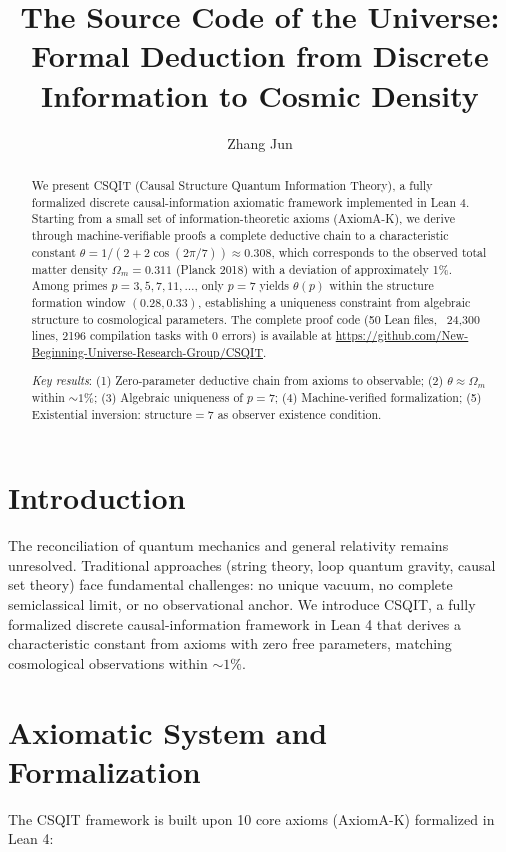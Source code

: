 \documentclass[aps,prl,twocolumn,nofootinbib,floatfix]{revtex4-2}
\title{The Source Code of the Universe: Formal Deduction from Discrete Information to Cosmic Density}
\author{Zhang Jun}
\affiliation{New Beginning Universe Research Group (Independent Researcher)}
\begin{document}
\maketitle

\begin{abstract}
We present CSQIT (Causal Structure Quantum Information Theory), a fully formalized discrete causal-information axiomatic framework implemented in Lean 4. Starting from a small set of information-theoretic axioms (AxiomA-K), we derive through machine-verifiable proofs a complete deductive chain to a characteristic constant $\theta = 1/(2+2\cos(2\pi/7)) \approx 0.308$, which corresponds to the observed total matter density $\Omega_m = 0.311$ (Planck 2018) with a deviation of approximately 1\%. Among primes $p=3,5,7,11,\ldots$, only $p=7$ yields $\theta(p)$ within the structure formation window $(0.28,0.33)$, establishing a uniqueness constraint from algebraic structure to cosmological parameters. The complete proof code (50 Lean files, ~24,300 lines, 2196 compilation tasks with 0 errors) is available at \url{https://github.com/New-Beginning-Universe-Research-Group/CSQIT}.

\textit{Key results}: (1) Zero-parameter deductive chain from axioms to observable; (2) $\theta \approx \Omega_m$ within $\sim 1\%$; (3) Algebraic uniqueness of $p=7$; (4) Machine-verified formalization; (5) Existential inversion: structure$=7$ as observer existence condition.
\end{abstract}

\section{Introduction}

The reconciliation of quantum mechanics and general relativity remains unresolved. Traditional approaches (string theory, loop quantum gravity, causal set theory) face fundamental challenges: no unique vacuum, no complete semiclassical limit, or no observational anchor. We introduce CSQIT, a fully formalized discrete causal-information framework in Lean 4 that derives a characteristic constant from axioms with zero free parameters, matching cosmological observations within $\sim 1\%$.

\section{Axiomatic System and Formalization}

The CSQIT framework is built upon 10 core axioms (AxiomA-K) formalized in Lean 4:
\end{document}
